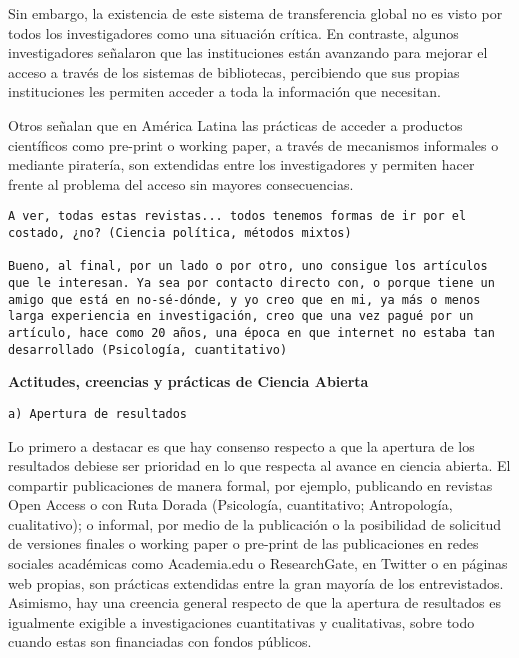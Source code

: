 \documentclass[
  letterpaper,
  DIV=11,
  numbers=noendperiod]{scrreprt}
\begin{document}
Sin embargo, la existencia de este sistema de transferencia global no es
visto por todos los investigadores como una situación crítica. En
contraste, algunos investigadores señalaron que las instituciones están
avanzando para mejorar el acceso a través de los sistemas de
bibliotecas, percibiendo que sus propias instituciones les permiten
acceder a toda la información que necesitan.

Otros señalan que en América Latina las prácticas de acceder a productos
científicos como pre-print o working paper, a través de mecanismos
informales o mediante piratería, son extendidas entre los investigadores
y permiten hacer frente al problema del acceso sin mayores
consecuencias.

\begin{verbatim}
A ver, todas estas revistas... todos tenemos formas de ir por el costado, ¿no? (Ciencia política, métodos mixtos)

Bueno, al final, por un lado o por otro, uno consigue los artículos que le interesan. Ya sea por contacto directo con, o porque tiene un amigo que está en no-sé-dónde, y yo creo que en mi, ya más o menos larga experiencia en investigación, creo que una vez pagué por un artículo, hace como 20 años, una época en que internet no estaba tan desarrollado (Psicología, cuantitativo)
\end{verbatim}

\textbf{Actitudes, creencias y prácticas de Ciencia Abierta}

\begin{verbatim}
a) Apertura de resultados
\end{verbatim}

Lo primero a destacar es que hay consenso respecto a que la apertura de
los resultados debiese ser prioridad en lo que respecta al avance en
ciencia abierta. El compartir publicaciones de manera formal, por
ejemplo, publicando en revistas Open Access o con Ruta Dorada
(Psicología, cuantitativo; Antropología, cualitativo); o informal, por
medio de la publicación o la posibilidad de solicitud de versiones
finales o working paper o pre-print de las publicaciones en redes
sociales académicas como Academia.edu o ResearchGate, en Twitter o en
páginas web propias, son prácticas extendidas entre la gran mayoría de
los entrevistados. Asimismo, hay una creencia general respecto de que la
apertura de resultados es igualmente exigible a investigaciones
cuantitativas y cualitativas, sobre todo cuando estas son financiadas
con fondos públicos.
\end{document}

